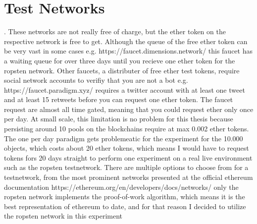 \section{Test Networks}. 
These networks are not really free of charge, but the ether token on the respective network is free to get. Although the queue of the free ether token can be very vast in some cases e.g. https://faucet.dimensions.network/ this faucet has a waiting queue for over three days until you recieve one ether token for the ropsten network. Other faucets, a distributer of free ether test tokens, require social network accounts to verifiy that you are not a bot e.g. https://faucet.paradigm.xyz/ requires a twitter account with at least one tweet and at least 15 retweets before you can request one ether token. The faucet request are almost all time gated, meaning that you could request ether only once per day. At small scale, this limitation is no problem for this thesis because persisting around 10 pools on the blockchains require at max 0.002 ether tokens. The one per day paradigm gets problemeatic for the experiment for the 10.000 objects, which costs about 20 ether tokens, which means I would have to request tokens fors 20 days straight to perform one experiment on a real live environment such as the ropsten testnetwork. 
There are multiple options to choose from for a testnetwork, from the most prominent networks presented at the official ethereum documentation https://ethereum.org/en/developers/docs/networks/ only the ropsten network implements the proof-of-work algorithm, which means it is the best representation of ethereum to date, and for that reason I decided to utilize the ropsten network in this experiment
